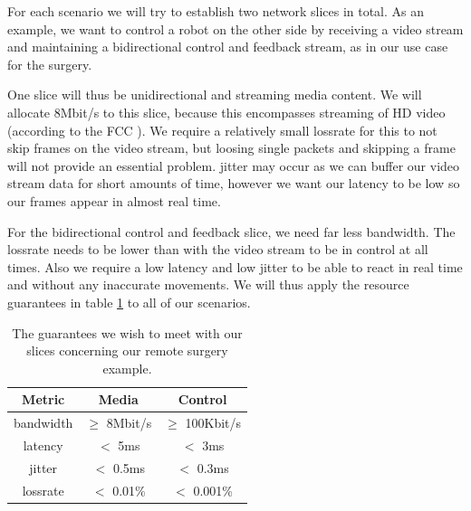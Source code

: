 
For each scenario we will try to establish two network slices in total. As an example, we want to control a robot on the other side by receiving a video stream and maintaining a bidirectional control and feedback stream, as in our use case for the surgery.

One slice will thus be unidirectional and streaming media content. We will allocate 8Mbit/s to this slice, because this encompasses streaming of HD video (according to the FCC \cite{fcc}). We require a relatively small \gls{lossrate} for this to not skip frames on the video stream, but loosing single packets and skipping a frame will not provide an essential problem. \Gls{jitter} may occur as we can buffer our video stream data for short amounts of time, however we want our \gls{latency} to be low so our frames appear in almost real time.

For the bidirectional control and feedback slice, we need far less \gls{bandwidth}. The \gls{lossrate} needs to be lower than with the video stream to be in control at all times. Also we require a low \gls{latency} and low \gls{jitter} to be able to react in real time and without any inaccurate movements. We will thus apply the resource guarantees in table \ref{table:slices} to all of our scenarios.

\begin{table}[ht]
    \centering
    \begin{tabular}{ |c|c|c| }
        \hline
        \textbf{Metric} & \textbf{Media} & \textbf{Control} \\
        \hline
        \Gls{bandwidth} & $\geq$ 8Mbit/s & $\geq$ 100Kbit/s \\
        \Gls{latency}   & $<$ 5ms        & $<$ 3ms          \\
        \Gls{jitter}    & $<$ 0.5ms      & $<$ 0.3ms        \\
        \Gls{lossrate}  & $<$ 0.01\%     & $<$ 0.001\%      \\
        \hline
    \end{tabular}
    \caption[Slice \acrshort{qos} guarantees in our remote surgery example]{The guarantees we wish to meet with our slices concerning our remote surgery example.}
    \label{table:slices}
\end{table}


